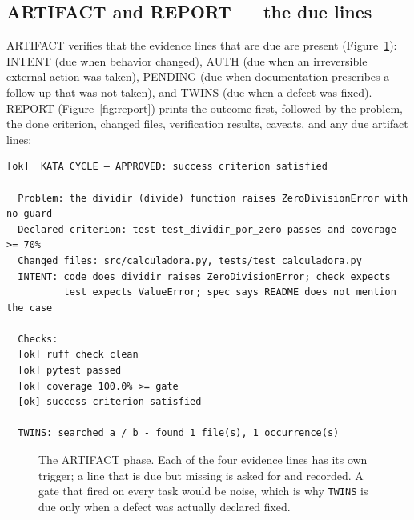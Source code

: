 \documentclass{sbc2019}%
\begin{document}
\subsection{ARTIFACT and REPORT --- the due lines}

ARTIFACT verifies that the evidence lines that are due are present
(Figure~\ref{fig:artifact}): INTENT
(due when behavior changed), AUTH (due when an irreversible external action
was taken), PENDING (due when documentation prescribes a follow-up that was
not taken), and TWINS (due when a defect was fixed). REPORT
(Figure~\ref{fig:report}) prints the
outcome first, followed by the problem, the done criterion, changed files,
verification results, caveats, and any due artifact lines:

\begin{lstlisting}
[ok]  KATA CYCLE — APPROVED: success criterion satisfied

  Problem: the dividir (divide) function raises ZeroDivisionError with no guard
  Declared criterion: test test_dividir_por_zero passes and coverage >= 70%
  Changed files: src/calculadora.py, tests/test_calculadora.py
  INTENT: code does dividir raises ZeroDivisionError; check expects
          test expects ValueError; spec says README does not mention the case

  Checks:
  [ok] ruff check clean
  [ok] pytest passed
  [ok] coverage 100.0% >= gate
  [ok] success criterion satisfied

  TWINS: searched a / b - found 1 file(s), 1 occurrence(s)
\end{lstlisting}


\begin{figure}[!ht]
\centering
{}
\caption{The ARTIFACT phase. Each of the four evidence lines has its own
trigger; a line that is due but missing is asked for and recorded. A gate
that fired on every task would be noise, which is why \texttt{TWINS} is
due only when a defect was actually declared fixed.}
\label{fig:artifact}
\end{figure}
\end{document}

